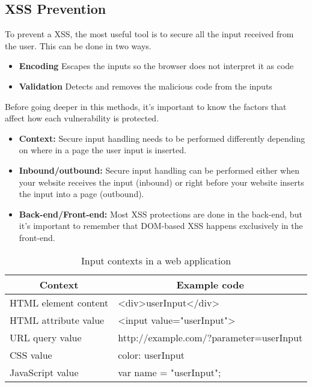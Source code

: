 
\subsection{XSS Prevention}
To prevent a XSS, the most useful tool is to secure all the input received from the user. This can be done in two ways.
\begin{itemize}
	\item\textbf{Encoding} Escapes the inputs so the browser does not interpret it as code
	\item\textbf{Validation} Detects and removes the malicious code from the inputs
\end{itemize}
Before going deeper in this methods, it's important to know the factors that affect how each vulnerability is protected.
\begin{itemize}
	\item \textbf{Context:} Secure input handling needs to be performed differently depending on where in a page the user input is inserted.
	\item \textbf{Inbound/outbound:} Secure input handling can be performed either when your website receives the input (inbound) or right before your website inserts the input into a page (outbound).
	\item \textbf{Back-end/Front-end:} Most XSS protections are done in the back-end, but it's important to remember that DOM-based XSS happens exclusively in the front-end.
\end{itemize}

\begin{table}[]
  \centering
  \caption{Input contexts in a web application}
  \label{input-context}
  \begin{tabular}{|l|l|}
    \hline
    \multicolumn{1}{|c|}{\textbf{Context}} & \multicolumn{1}{c|}{\textbf{Example code}}                         \\ \hline
    HTML element content                   & \textless{}div\textgreater{}userInput\textless{}/div\textgreater{} \\ \hline
    HTML attribute value                   & \textless{}input value="userInput"\textgreater{}                   \\ \hline
    URL query value                        & http://example.com/?parameter=userInput                            \\ \hline
    CSS value                              & color: userInput                                                   \\ \hline
    JavaScript value                       & var name = "userInput";                                            \\ \hline
  \end{tabular}
\end{table}

